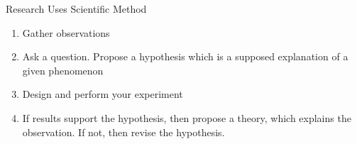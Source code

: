 \documentclass[11pt]{beamer}
\begin{document}
\begin{frame}{Research Uses Scientific Method}
  \begin{enumerate}
  \item Gather observations
  \item Ask a question. Propose a hypothesis
    which is a supposed explanation of a given phenomenon
  \item Design and perform your experiment
  \item If results support the hypothesis, then propose
    a theory, which explains the observation. If not, then revise
    the hypothesis.
  \end{enumerate}
\end{frame}
\end{document}
